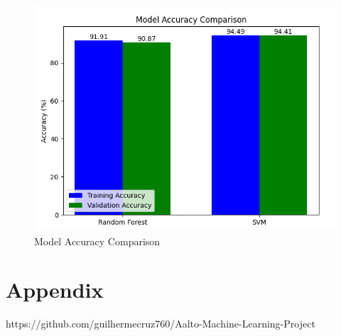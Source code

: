 \documentclass{article}
\begin{document}
\begin{figure}
    \centering
    \includegraphics[width=0.5\linewidth]{Figure_1.png}
    \caption{Model Accuracy Comparison}
    \label{fig:enter-label}
\end{figure}

\section{Appendix}
\printbibliography

https://github.com/guilhermecruz760/Aalto-Machine-Learning-Project
\end{document}
